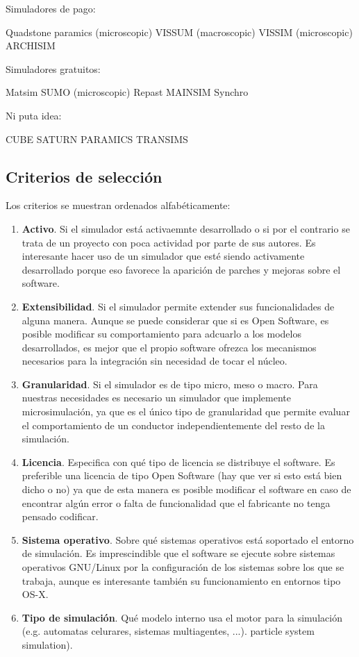 Simuladores de pago:

Quadstone paramics (microscopic)
VISSUM (macroscopic)
VISSIM (microscopic)
ARCHISIM

Simuladores gratuitos:

Matsim
SUMO (microscopic)
Repast
MAINSIM
Synchro

Ni puta idea:

CUBE
SATURN
PARAMICS
TRANSIMS


\subsection{Criterios de selección}

Los criterios se muestran ordenados alfabéticamente:

\begin{enumerate}
	\item \textbf{Activo}. Si el simulador está activaemnte desarrollado o si por el contrario se trata de un proyecto con poca actividad por parte de sus autores. Es interesante hacer uso de un simulador que esté siendo activamente desarrollado porque eso favorece la aparición de parches y mejoras sobre el software.
	\item \textbf{Extensibilidad}. Si el simulador permite extender sus funcionalidades de alguna manera. Aunque se puede considerar que si es Open Software, es posible modificar su comportamiento para adcuarlo a los modelos desarrollados, es mejor que el propio software ofrezca los mecanismos necesarios para la integración sin necesidad de tocar el núcleo.
	\item \textbf{Granularidad}. Si el simulador es de tipo micro, meso o macro. Para nuestras necesidades es necesario un simulador que implemente microsimulación, ya que es el único tipo de granularidad que permite evaluar el comportamiento de un conductor independientemente del resto de la simulación.
	\item \textbf{Licencia}. Especifica con qué tipo de licencia se distribuye el software. Es preferible una licencia de tipo Open Software (\TODO hay que ver si esto está bien dicho o no) ya que de esta manera es posible modificar el software en caso de encontrar algún error o falta de funcionalidad que el fabricante no tenga pensado codificar.
	\item \textbf{Sistema operativo}. Sobre qué sistemas operativos está soportado el entorno de simulación. Es imprescindible que el software se ejecute sobre sistemas operativos GNU/Linux por la configuración de los sistemas sobre los que se trabaja, aunque es interesante también su funcionamiento en entornos tipo OS-X.
	\item \textbf{Tipo de simulación}. Qué modelo interno usa el motor para la simulación (e.g. automatas celurares, sistemas multiagentes, ...).
	particle system simulation).
\end{enumerate}


